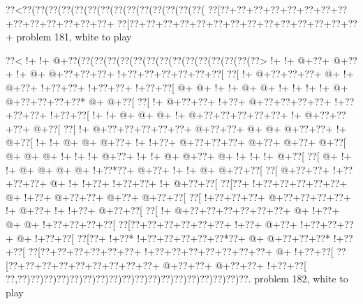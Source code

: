 \smallskip
\vbox{\0??<\0??(\0??(\0??(\0??(\0??(\0??(\0??(\0??(\0??(\0??(\0??(\0??(\0??(\0??(
\vbox{\0??[\0??+\0??+\0??+\0??+\0??+\0??+\0??+\0??+\0??+\0??+\0??+\0??+\0??+\0??+
\goo\0??[\0??+\0??+\0??+\0??+\0??+\0??+\0??+\0??+\0??+\0??+\0??+\0??+\0??+\0??+
}
\hfil problem 181, white to play\hfil\break
}

\vbox{\vbox{\goo
\0??<\- !+\- !+\- @+\0??(\0??(\0??(\0??(\0??(\0??(\0??(\0??(\0??(\0??(\0??(\0??(\0??(\0??(\0??>
\- !+\- !+\- @+\0??+\- @+\0??+\- !+\- @+\- @+\0??+\0??+\0??+\- !+\0??+\0??+\0??+\0??+\0??+\0??[
\0??[\- !+\- @+\0??+\0??+\0??+\- @+\- !+\- @+\0??+\- !+\0??+\0??+\- !+\0??+\0??+\- !+\0??+\0??[
\- @+\- @+\- !+\- !+\- @+\- @+\- !+\- !+\- !+\- !+\- @+\- @+\0??+\0??+\0??+\0??*\- @+\- @+\0??[
\0??[\- !+\- @+\0??+\0??+\- !+\0??+\- @+\0??+\0??+\0??+\0??+\- !+\0??+\0??+\0??+\- !+\0??+\0??[
\- !+\- !+\- @+\- @+\- @+\- !+\- @+\0??+\0??+\0??+\0??+\0??+\- !+\- @+\0??+\0??+\0??+\- @+\0??[
\0??[\- !+\- @+\0??+\0??+\0??+\0??+\0??+\- @+\0??+\0??+\- @+\- @+\- @+\0??+\0??+\- !+\- @+\0??[
\- !+\- !+\- @+\- @+\- @+\0??+\- !+\- !+\0??+\- @+\0??+\0??+\0??+\- @+\0??+\- @+\0??+\- @+\0??[
\- @+\- @+\- @+\- !+\- !+\- !+\- @+\0??+\- !+\- !+\- @+\- @+\0??+\- @+\- !+\- !+\- !+\- @+\0??[
\0??[\- @+\- !+\- !+\- @+\- @+\- @+\- @+\- !+\0??*\0??+\- @+\0??+\- !+\- !+\- @+\- @+\0??+\0??[
\0??[\- @+\0??+\0??+\- !+\0??+\0??+\0??+\- @+\- !+\- !+\0??+\- !+\0??+\0??+\- !+\- @+\0??+\0??[
\0??[\0??+\- !+\0??+\0??+\0??+\0??+\0??+\- @+\- !+\0??+\- @+\0??+\0??+\- @+\0??+\- @+\0??+\0??[
\0??[\- !+\0??+\0??+\0??+\- @+\0??+\0??+\0??+\0??+\- !+\- @+\0??+\- !+\- !+\0??+\- @+\0??+\0??[
\0??[\- !+\- @+\0??+\0??+\0??+\0??+\0??+\0??+\- @+\- !+\0??+\- @+\- @+\- !+\0??+\0??+\0??+\0??[
\0??[\0??+\0??+\0??+\0??+\0??+\0??+\- !+\0??+\- @+\0??+\- !+\0??+\0??+\0??+\- @+\- !+\0??+\0??[
\0??[\0??+\- !+\0??*\- !+\0??+\0??+\0??+\0??+\0??*\0??+\- @+\- @+\0??+\0??+\0??*\- !+\0??+\0??[
\0??[\0??+\0??+\0??+\0??+\0??+\0??+\- !+\0??+\0??+\0??+\0??+\0??+\0??+\0??+\- @+\- !+\0??+\0??[
\0??[\0??+\0??+\0??+\0??+\0??+\0??+\0??+\0??+\0??+\- @+\0??+\0??+\- @+\0??+\0??+\- !+\0??+\0??[
\0??,\0??)\0??)\0??)\0??)\0??)\0??)\0??)\0??)\0??)\0??)\0??)\0??)\0??)\0??)\0??)\0??)\0??)\0??.
}
\hfil problem 182, white to play\hfil\break
}

